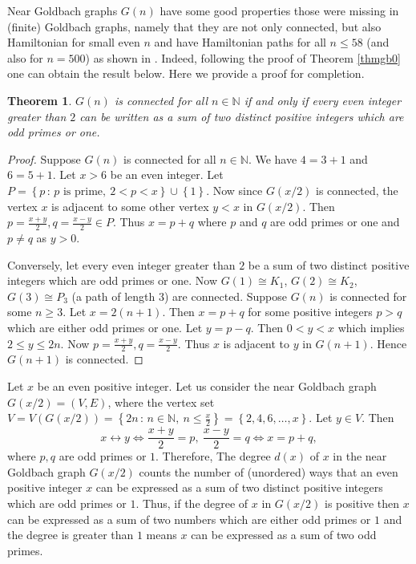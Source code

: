 \documentclass[11pt]{article}
\newtheorem{theorem}{Theorem}[section]
\theoremstyle{definition}
\theoremstyle{remark}
\numberwithin{equation}{section}
\newcommand{\Nat}{\mathbb{N}}
\newcommand{\set}[1]{\left\{#1\right\}}
\newcommand{\Set}[2]{\set{#1\, :\, #2}}
\begin{document}
\noindent
Near Goldbach graphs $G(n)$ have some good properties those were missing in (finite) Goldbach graphs, namely that they are not only connected, but also Hamiltonian for small even $n$ and have Hamiltonian paths for all $n\leq 58$ (and also for $n=500$) as shown in \cite{DGGS}. Indeed, following the proof of Theorem \ref{thmgb0} one can obtain the result below. Here we provide a proof for completion.

\begin{theorem}
$G(n)$ is connected for all $n\in\Nat$ if and only if every even integer greater than $2$ can be written as a sum of two distinct positive integers which are odd primes or one.
\end{theorem}

\begin{proof}
Suppose $G(n)$ is connected for all $n\in\Nat$. We have $4=3+1$ and $6=5+1$. Let $x>6$ be an even integer. Let $P=\Set{p}{p\text{ is prime},\ 2<p<x}\cup\set{1}$. Now since $G(x/2)$ is connected, the vertex $x$ is adjacent to some other vertex $y<x$ in $G(x/2)$. Then $p=\frac{x+y}{2},q=\frac{x-y}{2}\in P$. Thus $x=p+q$ where $p$ and $q$ are odd primes or one and $p\neq q$ as $y>0$.

\vspace{1em}
\noindent
Conversely, let every even integer greater than $2$ be a sum of two distinct positive integers which are odd primes or one. Now $G(1)\cong K_1$, $G(2)\cong K_2$, $G(3)\cong P_3$ (a path of length $3$) are connected. Suppose $G(n)$ is connected for some $n\geq 3$. Let $x=2(n+1)$. Then $x=p+q$ for some positive integers $p>q$ which are either odd primes or one. Let $y=p-q$. Then $0<y<x$ which implies $2\leq y\leq 2n$. Now $p=\frac{x+y}{2},q=\frac{x-y}{2}$. Thus $x$ is adjacent to $y$ in $G(n+1)$. Hence $G(n+1)$ is connected.
\end{proof}

\noindent
Let $x$ be an even positive integer. Let us consider the near Goldbach graph $G(x/2)=(V,E)$, where the vertex set $V=V(G(x/2))=\Set{2n}{n\in\Nat,\ n\leq\frac{x}{2}}=\set{2,4,6,\ldots,x}$. Let $y\in V$. Then
$$x\leftrightarrow y \Longleftrightarrow\frac{x+y}{2}=p,\ \frac{x-y}{2}=q\Longleftrightarrow x=p+q,$$
where $p,q$ are odd primes or $1$. Therefore, The degree $d(x)$ of $x$ in the near Goldbach graph $G(x/2)$ counts the number of (unordered) ways that an even positive integer $x$ can be expressed as a sum of two distinct positive integers which are odd primes or $1$. Thus, if the degree of $x$ in $G(x/2)$ is positive then $x$ can be expressed as a sum of two numbers which are either odd primes or $1$ and the degree is greater than $1$ means $x$ can be expressed as a sum of two odd primes. 
\end{document}
